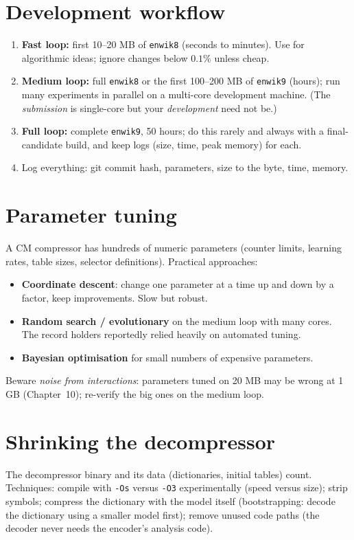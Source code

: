 \documentclass[11pt,a4paper,openany]{book}
\newcommand{\code}[1]{\texttt{#1}}
\theoremstyle{definition}
\theoremstyle{remark}
\begin{document}
\section{Development workflow}

\begin{enumerate}
\item \textbf{Fast loop:} first 10--20 MB of \code{enwik8} (seconds to minutes). Use for algorithmic ideas; ignore changes below $0.1\%$ unless cheap.
\item \textbf{Medium loop:} full \code{enwik8} or the first 100--200 MB of \code{enwik9} (hours); run many experiments in parallel on a multi-core development machine. (The \emph{submission} is single-core but your \emph{development} need not be.)
\item \textbf{Full loop:} complete \code{enwik9}, 50 hours; do this rarely and always with a final-candidate build, and keep logs (size, time, peak memory) for each.
\item Log everything: git commit hash, parameters, size to the byte, time, memory.
\end{enumerate}

\section{Parameter tuning}

A CM compressor has hundreds of numeric parameters (counter limits, learning rates, table sizes, selector definitions). Practical approaches:
\begin{itemize}
\item \textbf{Coordinate descent}: change one parameter at a time up and down by a factor, keep improvements. Slow but robust.
\item \textbf{Random search / evolutionary} on the medium loop with many cores. The record holders reportedly relied heavily on automated tuning.
\item \textbf{Bayesian optimisation} for small numbers of expensive parameters.
\end{itemize}
Beware \emph{noise from interactions}: parameters tuned on 20 MB may be wrong at 1 GB (Chapter~10); re-verify the big ones on the medium loop.

\section{Shrinking the decompressor}

The decompressor binary and its data (dictionaries, initial tables) count. Techniques: compile with \code{-Os} versus \code{-O3} experimentally (speed versus size); strip symbols; compress the dictionary with the model itself (bootstrapping: decode the dictionary using a smaller model first); remove unused code paths (the decoder never needs the encoder's analysis code).
\end{document}
